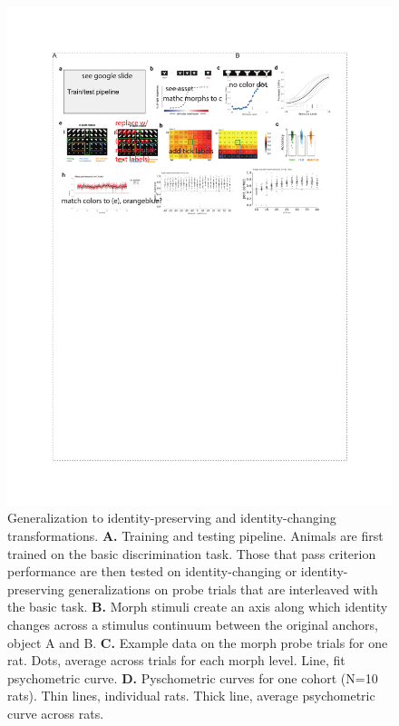 \begin{figure}[t!]
\includegraphics[width=\textwidth]{figures/chapter_1/fig_1-3_behavior_generalization/fig_1-3_behavior_generalization.pdf}
    \vspace{.1in}
    \caption[Generalization of visual behavior]{Generalization to identity-preserving and identity-changing transformations. 
    \textbf{A.} Training and testing pipeline. Animals are first trained on the basic discrimination task. Those that pass criterion performance are then tested on identity-changing or identity-preserving generalizations on probe trials that are interleaved with the basic task. 
    \textbf{B.} Morph stimuli create an axis along which identity changes across a stimulus continuum between the original anchors, object A and B. 
    \textbf{C.} Example data on the morph probe trials for one rat. Dots, average across trials for each morph level. Line, fit psychometric curve. 
    \textbf{D.} Pyschometric curves for one cohort (N=10 rats). Thin lines, individual rats. Thick line, average psychometric curve across rats. 
}
\end{figure}
